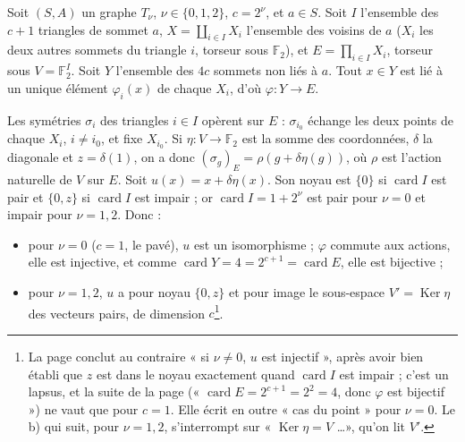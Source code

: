 \documentclass[11pt,a4paper]{article}
\begin{document}
Soit $(S, A)$ un graphe $T_\nu$, $\nu \in \lbrace 0, 1, 2\rbrace$, $c = 2^\nu$, et $a
\in S$. Soit $I$ l'ensemble des $c + 1$ triangles de sommet $a$, $X =
\coprod_{i \in I} X_i$ l'ensemble des voisins de $a$ ($X_i$ les deux autres
sommets du triangle $i$, torseur sous $\mathbb{F}_2$), et $E = \prod_{i \in I}
X_i$, torseur sous $V = \mathbb{F}_2^I$. Soit $Y$ l'ensemble des $4c$ sommets non
liés à $a$. Tout $x \in Y$ est lié à un unique élément $\varphi_i(x)$ de chaque
$X_i$, d'où $\varphi : Y \to E$.

Les symétries $\sigma_i$ des triangles $i \in I$ opèrent sur $E$ : $\sigma_{i_0}$
échange les deux points de chaque $X_i$, $i \neq i_0$, et fixe $X_{i_0}$. Si
$\eta : V \to \mathbb{F}_2$ est la somme des coordonnées, $\delta$ la diagonale et
$z = \delta(1)$, on a donc $(\sigma_g)_E = \rho(g + \delta\eta(g))$, où $\rho$ est
l'action naturelle de $V$ sur $E$. Soit $u(x) = x + \delta\eta(x)$. Son noyau est
$\lbrace 0\rbrace$ si $\operatorname{card} I$ est pair et $\lbrace 0, z\rbrace$ si
$\operatorname{card} I$ est impair ; or $\operatorname{card} I = 1 + 2^\nu$ est
pair pour $\nu = 0$ et impair pour $\nu = 1, 2$. Donc :

\begin{itemize}
\item pour $\nu = 0$ ($c = 1$, le pavé), $u$ est un isomorphisme ; $\varphi$
  commute aux actions, elle est injective, et comme $\operatorname{card} Y = 4 =
  2^{c+1} = \operatorname{card} E$, elle est bijective ;
\item pour $\nu = 1, 2$, $u$ a pour noyau $\lbrace 0, z\rbrace$ et pour image le
  sous-espace $V' = \operatorname{Ker}\eta$ des vecteurs pairs, de dimension
  $c$\footnote{La page conclut au contraire « si $\nu \neq 0$, $u$ est
  injectif », après avoir bien établi que $z$ est dans le noyau exactement quand
  $\operatorname{card} I$ est impair ; c'est un lapsus, et la suite de la page
  (« $\operatorname{card} E = 2^{c+1} = 2^2 = 4$, donc $\varphi$ est bijectif »)
  ne vaut que pour $c = 1$. Elle écrit en outre « cas du point » pour $\nu = 0$.
  Le b) qui suit, pour $\nu = 1, 2$, s'interrompt sur « $\operatorname{Ker}\eta =
  V$ \ldots », qu'on lit $V'$.}.
\end{itemize}
\end{document}
